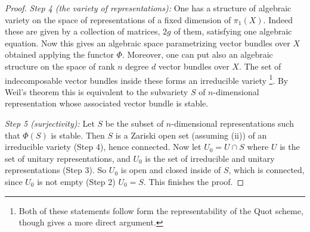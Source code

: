 \begin{proof}
\textit{Step 4 (the variety of representations):} One has a structure of
algebraic variety on the space of representations of a fixed dimension of
$\pi_1(X)$. Indeed these are given by a collection of matrices, $2g$ of
them, satisfying one algebraic equation. Now this gives an algebraic
space parametrizing vector bundles over $X$ obtained applying the
functor $\Phi$. Moreover, one can put also an algebraic structure on
the space of rank $n$ degree $d$ vector bundles over $X$. The set of indecomposable vector bundles inside these
forms an irreducible variety \footnote{Both of these statements follow
  form the representability of the Quot scheme, though \cite{NS} gives
  a more direct argument.}. By Weil's theorem this is equivalent to
the subvariety $S$ of $n$-dimensional representation whose associated
vector bundle is stable.

\textit{Step 5 (surjectivity):} Let $S$ be the subset of $n$-dimensional
representations such that $\Phi(S)$ is stable. Then $S$ is a Zariski
open set (assuming (ii)) of an irreducible variety (Step 4), hence
connected. Now let $U_0 = U\cap S$ where $U$ is the set of unitary
representations, and $U_0$ is the set of irreducible and unitary
representations (Step 3). So $U_0$ is open and closed inside of $S$,
which is connected, since $U_0$ is not empty (Step 2) $U_0=S$. This
finishes the proof.
\end{proof}
